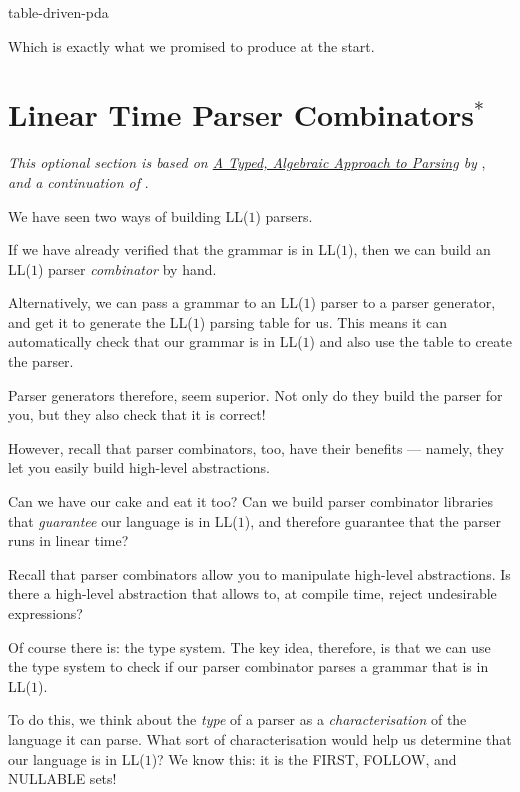 \begin{center}
    {table-driven-pda}
\end{center}

Which is exactly what we promised to produce at the start.

\section{Linear Time Parser Combinators$^*$}\label{section:linear-parser-combinators}
\textit{This optional section is based on \href{https://www.cl.cam.ac.uk/~jdy22/papers/a-typed-algebraic-approach-to-parsing.pdf}{A Typed, Algebraic Approach to Parsing} by} \citet{krishnaswami-2019}, \textit{and a continuation of} .

We have seen two ways of building LL($1$) parsers.

If we have already verified that the grammar is in LL($1$), then we can build an LL($1$) parser \textit{combinator} by hand. 

Alternatively, we can pass a grammar to an LL($1$) parser to a parser generator, and get it to generate the LL($1$) parsing table for us. This means it can automatically check that our grammar is in LL($1$) and also use the table to create the parser.

Parser generators therefore, seem superior. Not only do they build the parser for you, but they also check that it is correct!

However, recall that parser combinators, too, have their benefits --- namely, they let you easily build high-level abstractions.

Can we have our cake and eat it too? Can we build parser combinator libraries that \textit{guarantee} our language is in LL($1$), and therefore guarantee that the parser runs in linear time?

Recall that parser combinators allow you to manipulate high-level abstractions. Is there a high-level abstraction that allows to, at compile time, reject undesirable expressions?

Of course there is: the type system. The key idea, therefore, is that we can use the type system to check if our parser combinator parses a grammar that is in LL($1$). 

To do this, we think about the \textit{type} of a parser as a \textit{characterisation} of the language it can parse. What sort of characterisation would help us determine that our language is in LL($1$)? We know this: it is the \textsf{FIRST}, \textsf{FOLLOW}, and \textsf{NULLABLE} sets!

